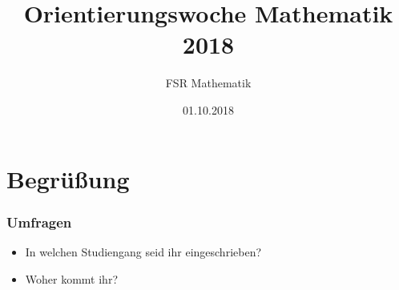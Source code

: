 

\title[Orientierungswoche Mathematik 2018]{Orientierungswoche Mathematik 2018}
\author{FSR Mathematik}
\date{01.10.2018}

\tucthreeheadlines
\frame{\titlepage}

\tuctwoheadlines
\nocite{*}
%
%
\section{Begrüßung}

\begin{frame}
\begin{center}
	\Huge {}
\end{center}
\end{frame}

\begin{frame}
	\frametitle{Umfragen}
	\begin{itemize}
		\item In welchen Studiengang seid ihr eingeschrieben?
		\item Woher kommt ihr?
	\end{itemize}
\end{frame}

